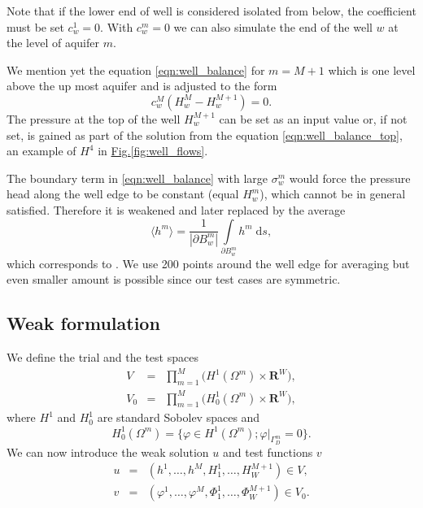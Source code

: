 \documentclass[preprint,12pt]{elsarticle}
\newcommand{\fig}[1]{\hyperref[#1]{Fig.\ref{#1}}}
\def\abs#1{\left|#1\right|}
\def\avg#1{\langle#1\rangle}
\def\abs#1{| #1 |}
\newcommand{\dd}{\; \mathrm{d}}
\newcommand{\R}{\mathbf{R}}
\begin{document}
Note that if the lower end of well is considered isolated from below, the coefficient must be set $c^1_w = 0$.
With $c^m_w = 0$ we can also simulate the end of the well $w$ at the level of aquifer $m$.

We mention yet the equation \eqref{eqn:well_balance} for $m=M+1$ which is one level above the up most aquifer
and is adjusted to the form
\begin{equation} \label{eqn:well_balance_top}
  c^M_w\left( H^{M}_w-H^{M+1}_w \right) = 0.
\end{equation}
The pressure at the top of the well $H^{M+1}_w$ can be set as an input value or, if not set, is gained 
as part of the solution from the equation \eqref{eqn:well_balance_top}, an example of $H^4$ in \fig{fig:well_flows}.

The boundary term in \eqref{eqn:well_balance} with large $\sigma^m_w$ would force the pressure head along the 
well edge to be constant (equal $H^m_w$), which cannot be in general satisfied. Therefore it is weakened and 
later replaced by the average
\begin{equation} \label{eqn:average}
  \avg{h^m} = \frac{1}{\abs{\partial B^m_w}} \int\limits_{\partial B^m_w} h^m \dd s,
\end{equation}
which corresponds to \cite{gracie}. We use 200 points around the well edge for averaging but even smaller 
amount is possible since our test cases are symmetric.

\subsection{Weak formulation}
We define the trial and the test spaces
\begin{eqnarray} \label{eqn:spaces}
  V &=& \prod\limits_{m=1}^{M}\big(H^1(\Omega^m)\times\R^W\big), \\
  V_0 &=& \prod\limits_{m=1}^{M}\big(H^1_0(\Omega^m)\times\R^W\big),
\end{eqnarray}
where $H^1$ and $H^1_0$ are standard Sobolev spaces and 
\[ H^1_0(\Omega^m)=\{\varphi\in H^1(\Omega^m); \varphi|_{\Gamma^m_D}=0\}. \]
We can now introduce the weak solution $u$ and test functions $v$
\begin{eqnarray} \label{eqn:solution}
   u &=& (h^1,\ldots, h^M, H^1_1,\ldots,H^{M+1}_W)\in V, \\
   v &=& (\varphi^1,\ldots, \varphi^M, \Phi^1_1,\ldots,\Phi^{M+1}_W)\in V_0.
\end{eqnarray}
\end{document}
